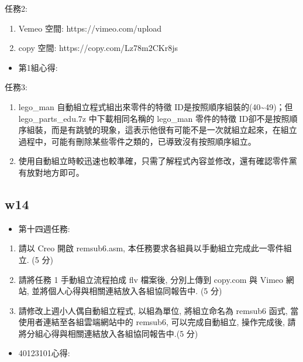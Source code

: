 \documentclass[]{article}
\begin{document}
任務2:

\begin{enumerate}
\def\labelenumi{\arabic{enumi}.}
\item
  Vemeo 空間: https://vimeo.com/upload
\item
  copy 空間: https://copy.com/Lz78m2CKr8js
\end{enumerate}

\begin{itemize}
\itemsep1pt\parskip0pt
\item
  第1組心得:
\end{itemize}

任務3:

\begin{enumerate}
\def\labelenumi{\arabic{enumi}.}
\item
  lego\_man 自動組立程式組出來零件的特徵
  ID是按照順序組裝的(40\textasciitilde{}49)；但lego\_parts\_edu.7z
  中下載相同名稱的 lego\_man 零件的特徵
  ID卻不是按照順序組裝，而是有跳號的現象，這表示他很有可能不是一次就組立起來，在組立過程中，可能有刪除某些零件之類的，已導致沒有按照順序組立。
\item
  使用自動組立時較迅速也較準確，只需了解程式內容並修改，還有確認零件黨有放對地方即可。
\end{enumerate}

\subsection{w14}\label{w14}

\begin{itemize}
\itemsep1pt\parskip0pt
\item
  第十四週任務:
\end{itemize}

\begin{enumerate}
\def\labelenumi{\arabic{enumi}.}
\item
  請以 Creo 開啟 remsub6.asm,
  本任務要求各組員以手動組立完成此一零件組立. (5 分)
\item
  請將任務 1 手動組立流程拍成 flv 檔案後, 分別上傳到 copy.com 與 Vimeo
  網站, 並將個人心得與相關連結放入各組協同報告中. (5 分)
\item
  請修改上週小人偶自動組立程式, 以組為單位, 將組立命名為 remsub6 函式,
  當使用者連結至各組雲端網站中的 remsub6, 可以完成自動組立, 操作完成後,
  請將分組心得與相關連結放入各組協同報告中.(5 分)
\end{enumerate}

\begin{itemize}
\itemsep1pt\parskip0pt
\item
  40123101心得:
\end{itemize}
\end{document}
